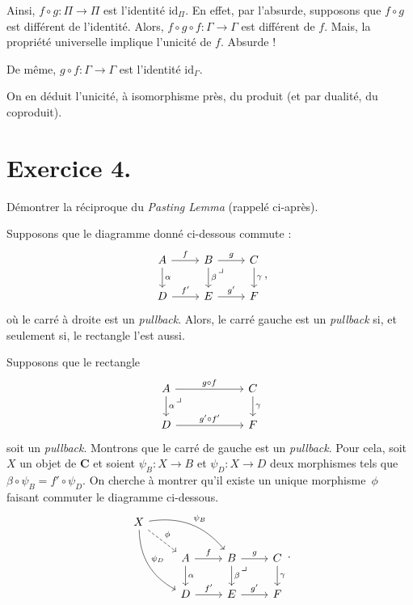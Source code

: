\documentclass{../../td}
\newcommand\pullback{\arrow[very near start,description,phantom]{dr}{\lrcorner}}
\begin{document}
\begin{itemize}
      Ainsi, $f \circ g : \Pi \to \Pi$ est l'identité $\mathrm{id}_\Pi$.
      En effet, par l'absurde, supposons que $f \circ g$ est différent de l'identité.
      Alors, $f \circ g \circ f : \Gamma \to \Gamma$ est différent de $f$.
      Mais, la propriété universelle implique l'unicité de $f$.
      Absurde !

      De même, $g \circ f : \Gamma \to \Gamma$ est l'identité $\mathrm{id}_\Gamma$.

      On en déduit l'unicité, à isomorphisme près, du produit (et par dualité, du coproduit).
  \end{itemize}

  \chapter{Exercice 4.}

  \begin{slshape}
    \color{deepblue}
    Démontrer la réciproque du \textit{Pasting Lemma} (rappelé ci-après).
  \end{slshape}

  \begin{lemm}
    Supposons que le diagramme donné ci-dessous commute :
    \[
    \begin{tikzcd}
      A \arrow{r}{f}\arrow{d}{\alpha} & B\arrow{r}{g}\arrow{d}{\beta}\pullback & C\arrow{d}{\gamma}\\
      D \arrow{r}{f'} & E\arrow{r}{g'} & F
    \end{tikzcd}
    ,\] 
    où le carré à droite est un \textit{pullback}.
    Alors, le carré gauche est un \textit{pullback} si, et seulement si, le rectangle l'est aussi.
  \end{lemm}

  Supposons que le rectangle \[
  \begin{tikzcd}
    A \arrow{rr}{g\circ f} \arrow{d}{\alpha}\pullback && C \arrow{d}{\gamma}\\
    D \arrow{rr}{g'\circ f'} &~& F
  \end{tikzcd}
  \] 
  soit un \textit{pullback}. Montrons que le carré de gauche est un \textit{pullback}.
  Pour cela, soit $X$ un objet de $\mathbf{C}$ et soient $\psi_B : X \to B$ et $\psi_D : X \to D$ deux morphismes tels que $\beta \circ \psi_B = f' \circ \psi_D$.
  On cherche à montrer qu'il existe un unique morphisme~$\phi$ faisant commuter le diagramme ci-dessous.
  \[
    \begin{tikzcd}
      X \arrow[dashed]{dr}{\phi} \arrow[bend left]{drr}{\psi_B} \arrow[bend right]{ddr}{\psi_D}\\
      &A \arrow{r}{f}\arrow{d}{\alpha} & B\arrow{r}{g}\arrow{d}{\beta}\pullback & C\arrow{d}{\gamma}\\
      &D \arrow{r}{f'} & E\arrow{r}{g'} & F
    \end{tikzcd}
  .\]
\end{document}
